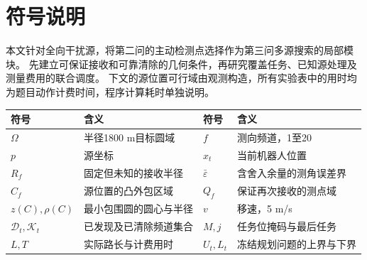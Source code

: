 \section{符号说明}\label{sec:symbols-q23}

本文针对全向干扰源，将第二问的主动检测点选择作为第三问多源搜索的局部模块。
先建立可保证接收和可靠清除的几何条件，再研究覆盖任务、已知源处理及测量费用的联合调度。
下文的源位置可行域由观测构造，所有实验表中的用时均为题目动作计费时间，程序计算耗时单独说明。

\Needspace{38mm}
\begin{center}
\begin{minipage}{\linewidth}
\centering\small
{}
\label{tab:q23-symbols}
\vspace{4pt}
\begin{tabular}{@{}
  >{\raggedright\arraybackslash}p{}
  >{\raggedright\arraybackslash}p{}
  >{\raggedright\arraybackslash}p{}
  >{\raggedright\arraybackslash}p{}@{}}
\toprule
\begin{minipage}[b]{\linewidth}\raggedright
符号
\end{minipage} & \begin{minipage}[b]{\linewidth}\raggedright
含义
\end{minipage} & \begin{minipage}[b]{\linewidth}\raggedright
符号
\end{minipage} & \begin{minipage}[b]{\linewidth}\raggedright
含义
\end{minipage} \\
\midrule
\(\Omega\) & 半径1800 m目标圆域 & \(f\) & 测向频道，1至20 \\
\(p\) & 源坐标 & \(x_t\) & 当前机器人位置 \\
\(R_f\) & 固定但未知的接收半径 & \(\bar\varepsilon\) & 含舍入余量的测角误差界 \\
\(\widehat C_f\) & 源位置的凸外包区域 & \(Q_f\) & 保证再次接收的测点域 \\
\(z(C),\rho(C)\) & 最小包围圆的圆心与半径 & \(v\) & 移速，5 m/s \\
\(\mathcal D_t,\mathcal K_t\) & 已发现及已清除频道集合 & \(M,j\) & 任务位掩码与最后任务 \\
\(L,T\) & 实际路长与计费用时 & \(U_t,L_t\) & 冻结规划问题的上界与下界 \\
\bottomrule
\end{tabular}
\end{minipage}
\end{center}
